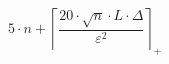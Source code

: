 \[5 \cdot n + \left\lceil \frac{20 \cdot \sqrt{n} \cdot L \cdot \Delta}{\varepsilon^{2}} \right\rceil_{+}\]
